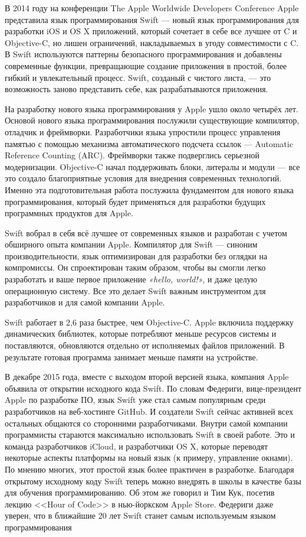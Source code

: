 
В 2014 году на конференции The Apple Worldwide Developers Conference Apple
представила язык программирования Swift --– новый язык программирования
для разработки iOS и OS X приложений, который сочетает в себе все лучшее от C и Objective-C,
но лишен ограничений, накладываемых в угоду совместимости с C.
В Swift используются паттерны безопасного программирования и добавлены
современные функции, превращающие создание приложения в простой,
более гибкий и увлекательный процесс. Swift, созданый с чистого листа, ---
это возможность заново представить себе, как разрабатываются приложения.

На разработку нового языка программирования у Apple ушло около четырёх лет.
Основой нового языка программирования послужили существующие компилятор,
отладчик и фреймворки. Разработчики языка упростили процесс управления памятью
с помощью механизма автоматического подсчета ссылок --- Automatic Reference Counting (ARC).
Фреймворки также подверглись серьезной модернизации. Objective-C начал
поддерживать блоки, литералы и модули --- все это создало благоприятные условия
для внедрения современных технологий. Именно эта подготовительная работа
послужила фундаментом для нового языка программирования,
который будет применяться для разработки будущих программных продуктов для Apple.

Swift вобрал в себя всё лучшее от современных языков и разработан с учетом
обширного опыта компании Apple. Компилятор для Swift --- синоним производительности,
язык оптимизирован для разработки без оглядки на компромиссы.
Он спроектирован таким образом, чтобы вы смогли легко разработать
и ваше первое приложение \textit{«hello, world!»}, и даже целую операционную систему.
Все это делает Swift важным инструментом для разработчиков и для самой компании Apple.

Swift работает в 2,6 раза быстрее, чем Objective-C. Apple включила поддержку
динамических библиотек, которые потребляют меньше ресурсов системы и поставляются,
обновляются отдельно от исполняемых файлов приложений.
В результате готовая программа занимает меньше памяти на устройстве.

В декабре 2015 года, вместе с выходом второй версией языка, компания Apple
объявила от открытии исходного кода Swift.
По словам Федериги, вице-президент Apple по разработке ПО, язык Swift уже
стал самым популярным среди разработчиков на веб-хостинге GitHub.
И создатели Swift сейчас активней всех остальных общаются со сторонними разработчиками.
Внутри самой компании программисты стараются максимально использовать Swift
в своей работе. Это и команда разработчиков iCloud, и разработчики OS X,
которые переводят некоторые аспекты платформы на новый язык (к примеру,
управление окнами). По мнению многих, этот простой язык более практичен в разработке.
Благодаря открытому исходному коду Swift теперь можно внедрять
в школы в качестве базы для обучения программированию. Об этом же говорил
и Тим Кук, посетив лекцию <<Hour of Code>> в нью-йоркском Apple Store.
Федериги даже уверен, что в ближайшие 20 лет Swift станет самым
используемым языком программирования~\cite{federighi_about_swift, habr_swift}

